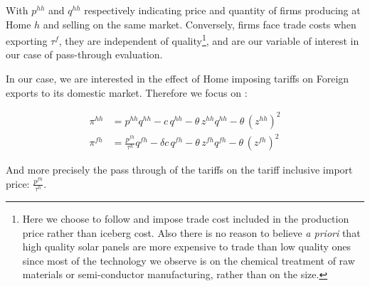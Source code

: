 With $p^{hh}$ and $q^{hh}$ respectively indicating price and quantity of firms producing at Home $h$ and selling on the same market. Conversely, firms face trade costs when exporting $\tau^f$, they are independent of quality\footnote{Here we choose to follow \cite{antoniadesHeterogeneousFirmsQuality2015} and impose trade cost included in the production price rather than iceberg cost. Also there is no reason to believe \textit{a priori} that high quality solar panels are more expensive to trade than low quality ones since most of the technology we observe is on the chemical treatment of raw materials or semi-conductor manufacturing, rather than on the size.}, and are our variable of interest in our case of pass-through evaluation.

In our case, we are interested in the effect of Home imposing tariffs on Foreign exports to its domestic market. Therefore we focus on : 

\begin{equation}
    \begin{aligned}
        \pi^{hh} &= p^{hh}q^{hh} - c\,q^{hh} - \theta\,z^{hh}q^{hh} - \theta\,(z^{hh})^2 \\
        \pi^{fh} &= \frac{p^{fh}}{\tau^h} q^{fh} - \delta c\,q^{fh} - \theta\,z^{fh}q^{fh} - \theta\,(z^{fh})^2
    \end{aligned}
\end{equation}

And more precisely the pass through of the tariffs on the tariff inclusive import price: $\frac{p^{fh}}{\tau^h}$.

